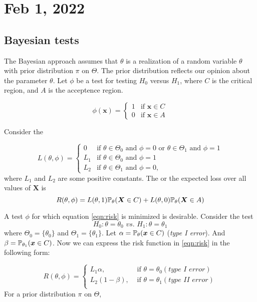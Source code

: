 \section{Feb 1, 2022}
\subsection{Bayesian tests}
The Bayesian approach assumes that $\theta$ is a realization of a random variable $\theta$ with prior distribution $\pi$ on $\Theta$. The prior distribution reflects our opinion about the parameter $\theta$. Let $\phi$ be a test for testing $H_0$ versus $H_1$, where $C$ is the critical region, and $A$ is the acceptence region.

\begin{equation}
    \phi(\boldsymbol{x}) = 
        \begin{cases}
         1 & \text{if } \boldsymbol{x} \in C \\
        0  & \text{if } \boldsymbol{x} \in A
        \end{cases}
\end{equation}

Consider the 

$$
L(\theta,\phi) = 
    \begin{cases}
     0 & \text{if }  \theta \in \Theta_0 \text{ and } \phi = 0 \text{ or } \theta \in \Theta_1 \text{ and } \phi = 1\\
     L_1  & \text{if }  \theta \in \Theta_0 \text{ and } \phi = 1 \\
     L_2 & \text{if }  \theta \in \Theta_1 \text{ and } \phi = 0,
    \end{cases}
$$
where $L_1$ and $L_2$ are some positive constants. The  or the expected loss over all values of $\boldsymbol{X}$ is
\begin{equation}\label{eqn:risk}
    R(\theta,\phi) = L(\theta, 1)\mathbb P_{\theta}(\boldsymbol{X} \in C) + L(\theta, 0)\mathbb P_{\theta}(\boldsymbol{X} \in A)
\end{equation}

A test $\phi$ for which equation \eqref{eqn:risk} is minimized is desirable. Consider the test 
$$
H_0: \theta = \theta_0 \textit{ vs. } H_1: \theta = \theta_1
$$
where $\Theta_0 = \{\theta_0\}$ and $\Theta_1 = \{\theta_1\}$. Let $\alpha = \mathbb P_{\theta}(\boldsymbol{x} \in C)$ (\textit{type I error}). And $\beta = \mathbb P_{\theta_1}(\boldsymbol{x} \in C)$. Now we can express the risk function in \eqref{eqn:risk} in the following form:

\begin{equation}\label{eqn:risk2}
    R(\theta,\phi) = 
    \begin{cases}
    L_1\alpha, & \text{ if } \theta =  \theta_0 (\textit{type I error}) \\
    L_2(1-\beta), & \text{ if }  \theta = \theta_1 (\textit{type II error}) \\
    \end{cases}
\end{equation}
For a prior distribution $\pi$ on $\Theta$,

